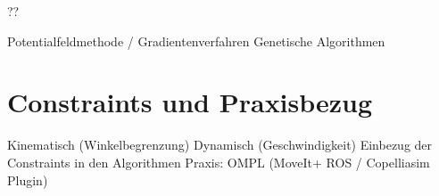 ??

Potentialfeldmethode / Gradientenverfahren
Genetische Algorithmen


\section{Constraints und Praxisbezug}
Kinematisch (Winkelbegrenzung)
Dynamisch (Geschwindigkeit)
Einbezug der Constraints in den Algorithmen
Praxis: OMPL (MoveIt+ ROS / Copelliasim Plugin)

